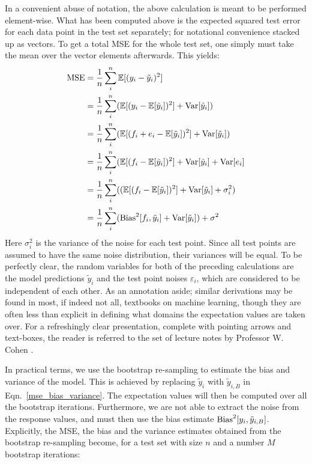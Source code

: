 \documentclass[reprint, english, nofootinbib]{revtex4-2}
\begin{document}
        In a convenient abuse of notation, the above calculation is meant to be performed element-wise. What has been computed above is the expected squared test error for each data point in the test set separately; for notational convenience stacked up as vectors. To get a total MSE for the whole test set, one simply must take the mean over the vector elements afterwards. This yields:
        \begin{align}
        \label{mse_bias_variance}
        \begin{split}
        \textup{MSE} &= \frac{1}{n} \sum^{n}_{i} \mathbb{E} [(y_{i} - \tilde{y}_{i})^2]  \\
        &= \frac{1}{n} \sum^{n}_{i} (\mathbb{E}[(y_{i} - \mathbb{E}[\tilde{y}_{i}])^2]+\textup{Var}[\tilde{y}_{i}]) \\
        &= \frac{1}{n} \sum^{n}_{i} (\mathbb{E}[(f_{i} + e_{i} - \mathbb{E}[\tilde{y}_{i}])^2] + \textup{Var}[\tilde{y}_{i}]) \\
        &= \frac{1}{n} \sum^{n}_{i} (\mathbb{E}[(f_{i} - \mathbb{E}[\tilde{y}_{i}])^2] + \textup{Var}[\tilde{y}_{i}] + \textup{Var}[e_{i}] \\
        &= \frac{1}{n} \sum^{n}_{i} ((\mathbb{E}[(f_{i} - \mathbb{E}[\tilde{y}_{i}])^2] + \textup{Var}[\tilde{y}_{i}] + \sigma_{i}^2) \\
        &=  \frac{1}{n} \sum^{n}_{i} (\textup{Bias}^2[f_i,\tilde{y}_{i}] + \textup{Var}[\tilde{y}_{i}]) + \sigma^2
        \end{split}
        \end{align}
        Here $\sigma_{i}^2$ is the variance of the noise for each test point. Since all test points are assumed to have the same noise distribution, their variances will be equal.  To be perfectly clear, the random variables for both of the preceding calculations are the model predictions $\tilde{y}_{i}$ and the test point noises $\varepsilon_{i}$, which are considered to be independent of each other. As an annotation aside; similar derivations may be found in most, if indeed not all, textbooks on machine learning, though they are often less than explicit in defining what domains the expectation values are taken over. For a refreshingly clear presentation, complete with pointing arrows and text-boxes, the reader is referred to the set of lecture notes by Professor W. Cohen \cite{cohen}.

        In practical terms, we use the bootstrap re-sampling to estimate the bias and variance of the model. This is achieved by replacing $\tilde{y}_{i}$ with $\tilde{y}_{i,B}$ in Eqn.~\ref{mse_bias_variance}. The expectation values will then be computed over all the bootstrap iterations. Furthermore, we are not able to extract the noise from the response values, and must then use the bias estimate $\textup{Bias}^2[y_{i},\tilde{y}_{i,B}]$. Explicitly, the MSE, the bias and the variance estimates obtained from the bootstrap re-sampling become, for a test set with size $n$ and a number $M$ bootstrap iterations:
\end{document}
